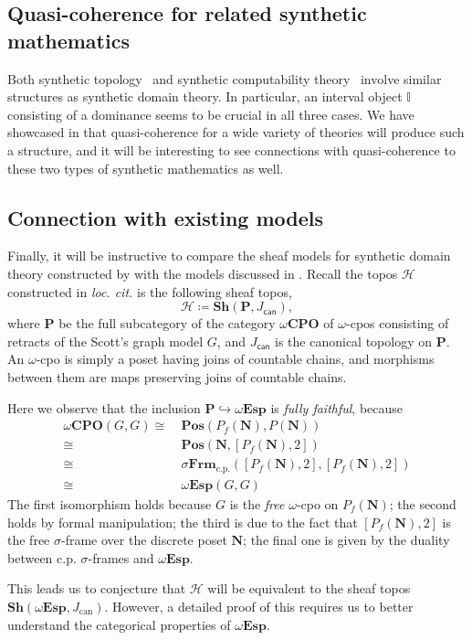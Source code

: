 \documentclass[a4paper,12pt]{amsart}
\theoremstyle{definition}
\newcommand{\mc}[1]{\mathcal{#1}}
\newcommand{\mb}[1]{\mathbf{#1}}
\newcommand{\mbb}[1]{\mathbb{#1}}
\newcommand{\I}{\mbb I}
\newcommand{\mr}[1]{\mathrm{#1}}
\newcommand{\ms}[1]{\mathsf{#1}}
\newcommand{\Pos}{\mb{Pos}}
\newcommand{\sh}{\mb{Sh}}
\newcommand{\hook}{\hookrightarrow}
\newcommand{\cp}{_{\mr{c.p.}}}
\newcommand{\N}{\mb N}
\newcommand{\wCPO}{\omega\mb{CPO}}
\newcommand{\sFrm}{\sigma\mb{Frm}}
\newcommand{\wTop}{\omega\mb{Esp}}
\begin{document}

\subsection{Quasi-coherence for related synthetic mathematics}

Both synthetic topology~\cite{bauer2009dedekind} and synthetic computability theory~\cite{RN552} involve similar structures as synthetic domain theory. In particular, an interval object $\I$ consisting of a dominance seems to be crucial in all three cases. We have showcased in  that quasi-coherence for a wide variety of theories will produce such a structure, and it will be interesting to see connections with quasi-coherence to these two types of synthetic mathematics as well.

\subsection{Connection with existing models}\label{subsec:compare}

Finally, it will be instructive to compare the sheaf models for synthetic domain theory constructed by \citet{FIORE1997151} with the models discussed in . Recall the topos $\mc H$ constructed in \emph{loc. cit.} is the following sheaf topos,
\[ \mc H \coloneq \sh(\mb P,J_{\ms{can}}), \]
where $\mb P$ be the full subcategory of the category $\wCPO$ of $\omega$-cpos consisting of retracts of the Scott's graph model $G$, and $J_{\ms{can}}$ is the canonical topology on $\mb P$. An $\omega$-cpo is simply a poset having joins of countable chains, and morphisms between them are maps preserving joins of countable chains.

Here we observe that the inclusion $\mb P \hook \wTop$ is \emph{fully faithful}, because
\begin{align*}
  \wCPO(G,G)
  \cong\ & \Pos(P_f(\N),P(\N)) \\
  \cong\ & \Pos(\N,[P_f(\N),2]) \\
  \cong\ & \sFrm\cp([P_f(\N),2],[P_f(\N),2]) \\ 
  \cong\ & \wTop(G,G)
\end{align*}
The first isomorphism holds because $G$ is the \emph{free} $\omega$-cpo on $P_f(\N)$; the second holds by formal manipulation; the third is due to the fact that $[P_f(\N),2]$ is the free $\sigma$-frame over the discrete poset $\N$; the final one is given by the duality between c.p. $\sigma$-frames and $\wTop$. 

This leads us to conjecture that $\mc H$ will be equivalent to the sheaf topos $\sh(\wTop,J_{\mr{can}})$. However, a detailed proof of this requires us to better understand the categorical properties of $\wTop$.

 

\end{document}

